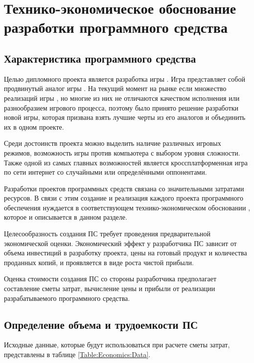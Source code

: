 


\section{Технико-экономическое обоснование разработки программного средства}
\subsection{Характеристика программного средства}

Целью дипломного проекта является разработка игры \BinaryWars. Игра представляет собой продвинутый аналог игры \TicTacToe. На текущий момент на рынке если множество реализаций игры \TicTacToe, но многие из них не отличаются качеством исполнения или разнообразием игрового процесса, поэтому было принято решение разработки новой игры, которая призвана взять лучшие черты из его аналогов и объединить их в одном проекте.

Среди достоинств проекта можно выделить наличие различных игровых режимов, возможность игры против компьютера с выбором уровня сложности. Также одной из самых главных возможностей является кроссплатформенная игра по сети интернет со случайными или определёнными оппонентами.

Разработки проектов программных средств связана со значительными затратами ресурсов. В связи с этим создание и реализация каждого проекта программного обеспечения нуждается в соответствующем технико-экономическом обосновании \cite{Palitsyn, Gorovoi}, которое и описывается в данном разделе.

Целесообразность создания ПС требует проведения предварительной экономической оценки. Экономический эффект у разработчика ПС зависит от объема инвестиций в разработку проекта, цены на готовый продукт и количества проданных копий, и проявляется в виде роста чистой прибыли.

Оценка стоимости создания ПС со стороны разработчика предполагает составление сметы затрат, вычисление цены и прибыли от реализации разрабатываемого программного средства.


\subsection{Определение объема и трудоемкости ПС}

Исходные данные, которые будут использоваться при расчете сметы затрат, представлены в таблице \ref{Table:Economics:Data}.

